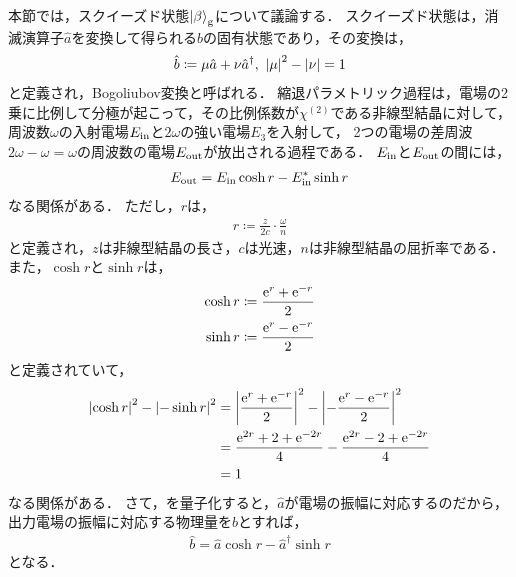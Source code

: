\documentclass{report}
\begin{document}
  本節では，スクイーズド状態$\ket{\beta}_{\mathrm{g}}$について議論する．
  スクイーズド状態は，消滅演算子$\hat{a}$を変換して得られる$\hat{b}$の固有状態であり，その変換は，
  \begin{align}
    \hat{b} \coloneqq \mu\hat{a} + \nu\hat{a}^{\dag},\ \abs{\mu}^2 - \abs{\nu} = 1
  \end{align}
  と定義され，Bogoliubov変換と呼ばれる．
  縮退パラメトリック過程は，電場の2乗に比例して分極が起こって，その比例係数が$\chi^{(2)}$である非線型結晶に対して，
  周波数$\omega$の入射電場$E_{\mathrm{in}}$と$2\omega$の強い電場$E_3$を入射して，
  2つの電場の差周波$2\omega - \omega = \omega$の周波数の電場$E_{\mathrm{out}}$が放出される過程である．
  $E_{\mathrm{in}}$と$E_{\mathrm{out}}$の間には，
  \begin{align}
    E_{\mathrm{out}} = E_{\mathrm{in}}\cosh r - E_{\mathrm{in}}^*\sinh r \label{spdc-classical}
  \end{align}
  なる関係がある．
  ただし，$r$は，
  \begin{align}
    r \coloneqq \frac{z}{2c}\cdot\frac{\omega}{n}
  \end{align}
  と定義され，$z$は非線型結晶の長さ，$c$は光速，$n$は非線型結晶の屈折率である．
  また，$\cosh r$と$\sinh r$は，
  \begin{align}
    \cosh r &\coloneqq \frac{\mathrm{e}^r + \mathrm{e}^{-r}}{2} \\ 
    \sinh r &\coloneqq \frac{\mathrm{e}^r - \mathrm{e}^{-r}}{2} \\ 
  \end{align}
  と定義されていて，
  \begin{align}
    \abs{\cosh r}^2 - \abs{-\sinh r}^2 &= \abs{\frac{\mathrm{e}^r + \mathrm{e}^{-r}}{2}}^2 - \abs{-\frac{\mathrm{e}^r - \mathrm{e}^{-r}}{2}}^2 \\ 
    &= \frac{\mathrm{e}^{2r} + 2 + \mathrm{e}^{-2r}}{4} - \frac{\mathrm{e}^{2r} - 2 + \mathrm{e}^{-2r}}{4} \\ 
    &= 1 \label{cosh-sinh-relation}
  \end{align}
  なる関係がある．
  さて，を量子化すると，$\hat{a}$が電場の振幅に対応するのだから，
  出力電場の振幅に対応する物理量を$\hat{b}$とすれば，
  \begin{align}
    \hat{b} = \hat{a}\cosh r - \hat{a}^{\dag}\sinh r
  \end{align}
  となる．
\end{document}
